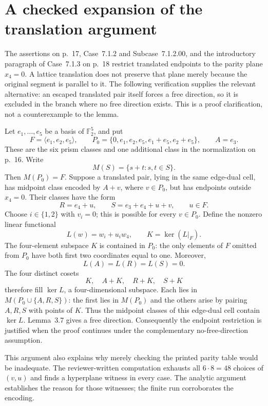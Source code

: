 \documentclass[10pt]{article}
\begin{document}
\section*{A checked expansion of the translation argument}
The assertions on p. 17, Case 7.1.2 and Subcase 7.1.2.00, and the introductory paragraph of Case 7.1.3 on p. 18 restrict translated endpoints to the parity plane \(x_4=0\). A lattice translation does not preserve that plane merely because the original segment is parallel to it. The following verification supplies the relevant alternative: an escaped translated pair itself forces a free direction, so it is excluded in the branch where no free direction exists. This is a proof clarification, not a counterexample to the lemma.\par
Let \(e_1,\ldots,e_5\) be a basis of \(\mathbb F_2^5\), and put \[F=\langle e_1,e_2,e_5\rangle,\qquad
 P_0=\{0,e_1,e_2,e_5,e_1+e_5,e_2+e_5\},\qquad A=e_3.\] These are the six prism classes and one additional class in the normalization on p. 16. Write \[M(S)=\{s+t:s,t\in S\}.\] Then \(M(P_0)=F\). Suppose a translated pair, lying in the same edge-dual cell, has midpoint class encoded by \(A+v\), where \(v\in P_0\), but has endpoints outside \(x_4=0\). Their classes have the form \[R=e_4+u,\qquad S=e_3+e_4+u+v,\qquad u\in F.\] Choose \(i\in\{1,2\}\) with \(v_i=0\); this is possible for every \(v\in P_0\). Define the nonzero linear functional \[L(w)=w_i+u_iw_4,\qquad K=\ker(L|_F).\] The four-element subspace \(K\) is contained in \(P_0\): the only elements of \(F\) omitted from \(P_0\) have both first two coordinates equal to one. Moreover, \[L(A)=L(R)=L(S)=0.\] The four distinct cosets \[K,\quad A+K,\quad R+K,\quad S+K\] therefore fill \(\ker L\), a four-dimensional subspace. Each lies in \(M(P_0\cup\{A,R,S\})\): the first lies in \(M(P_0)\) and the others arise by pairing \(A,R,S\) with points of \(K\). Thus the midpoint classes of this edge-dual cell contain \(\ker L\). Lemma 3.7 gives a free direction. Consequently the endpoint restriction is justified when the proof continues under the complementary no-free-direction assumption.\par
This argument also explains why merely checking the printed parity table would be inadequate. The reviewer-written computation exhausts all \(6\cdot8=48\) choices of \((v,u)\) and finds a hyperplane witness in every case. The analytic argument establishes the reason for those witnesses; the finite run corroborates the encoding.\par
\end{document}
